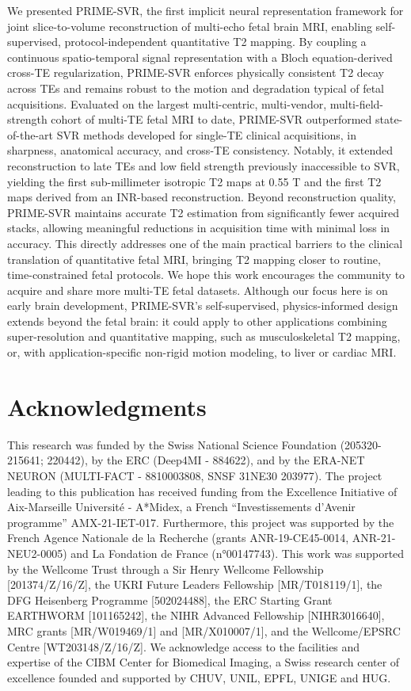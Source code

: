 \documentclass[preprint,authoryear,12pt]{elsarticle}
\begin{document}
We presented PRIME-SVR, the first implicit neural representation framework for joint slice-to-volume reconstruction of multi-echo fetal brain MRI, enabling self-supervised, protocol-independent quantitative T2 mapping. By coupling a continuous spatio-temporal signal representation with a Bloch equation-derived cross-TE regularization, PRIME-SVR enforces physically consistent T2 decay across TEs and remains robust to the motion and degradation typical of fetal acquisitions. Evaluated on the largest multi-centric, multi-vendor, multi-field-strength cohort of multi-TE fetal MRI to date, PRIME-SVR outperformed state-of-the-art SVR methods developed for single-TE clinical acquisitions, in sharpness, anatomical accuracy, and cross-TE consistency. Notably, it extended reconstruction to late TEs and low field strength previously inaccessible to SVR, yielding the first sub-millimeter isotropic T2 maps at 0.55 T and the first T2 maps derived from an INR-based reconstruction. Beyond reconstruction quality, PRIME-SVR maintains accurate T2 estimation from significantly fewer acquired stacks, allowing meaningful reductions in acquisition time with minimal loss in accuracy. This directly addresses one of the main practical barriers to the clinical translation of quantitative fetal MRI, bringing T2 mapping closer to routine, time-constrained fetal protocols.
We hope this work encourages the community to acquire and share more multi-TE fetal datasets. Although our focus here is on early brain development, PRIME-SVR's self-supervised, physics-informed design extends beyond the fetal brain: it could apply to other applications combining super-resolution and quantitative mapping, such as musculoskeletal T2 mapping, or, with application-specific non-rigid motion modeling, to liver or cardiac MRI.

\section{Acknowledgments}
This research was funded by the Swiss National Science Foundation (205320-215641; 220442), by the ERC (Deep4MI - 884622), and
by the ERA-NET NEURON (MULTI-FACT - 8810003808, SNSF 31NE30 203977). 
The project leading to this publication has received funding from the Excellence Initiative of Aix-Marseille Université - A*Midex, a French “Investissements d’Avenir programme” AMX-21-IET-017. Furthermore, this project was supported by the French Agence Nationale de la Recherche (grants ANR-19-CE45-0014, ANR-21-NEU2-0005) and La Fondation de France (n°00147743).
This work was supported by the Wellcome Trust through a Sir Henry Wellcome Fellowship [201374/Z/16/Z], the UKRI Future Leaders Fellowship [MR/T018119/1], the DFG Heisenberg Programme [502024488], the ERC Starting Grant EARTHWORM [101165242], the NIHR Advanced Fellowship [NIHR3016640], MRC grants [MR/W019469/1] and [MR/X010007/1], and the Wellcome/EPSRC Centre [WT203148/Z/16/Z]. We acknowledge access to the facilities and expertise of the CIBM Center for Biomedical Imaging, a Swiss research center of excellence founded and supported by CHUV, UNIL, EPFL, UNIGE and HUG. 
\end{document}
